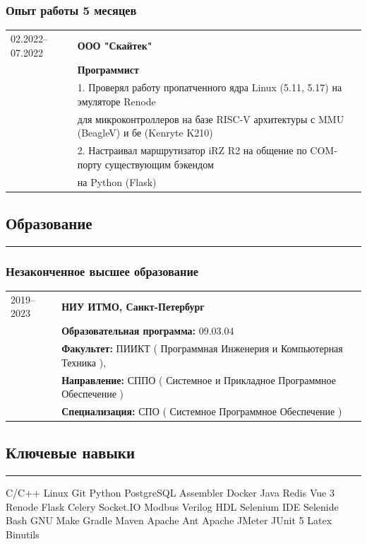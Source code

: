\documentclass[10pt, final, twoside]{article}
\newcommand{\skill}[1]{\colorbox{darkgray4}{\textcolor{darkgray2}{#1}}}
\begin{document}
  \subsubsection*{Опыт работы 5 месяцев}
  \begin{table}[H]
    \begin{tabular}{ll}
      02.2022--07.2022 & \textbf{ООО "Скайтек"}\\
                       & \textbf{Программист}\\
                       & 1. Проверял работу пропатченного ядра Linux (5.11, 5.17) на эмуляторе   Renode\\
                       & для микроконтроллеров на базе RISC-V архитектуры с MMU (BeagleV) и бе   (Kenryte K210)\\
                       & 2. Настраивал маршрутизатор iRZ R2 на общение по COM-порту    существующим бэкендом\\
                       & на Python (Flask)
    \end{tabular}
  \end{table}
  

  \subsection*{\textcolor{darkgray2}{Образование}}
  \vspace*{-5.5mm}
  \par\noindent\rule{\textwidth}{0.1pt}
  \subsubsection*{Незаконченное высшее образование}
  \begin{table}[H]
    \begin{tabular}{ll}
      2019--2023 & \textbf{НИУ ИТМО, Санкт-Петербург}\\
                 & \textbf{Образовательная программа:} 09.03.04\\
                 & \textbf{Факультет:} ПИИКТ ( Программная Инженерия и Компьютерная Техника ),\\
                 & \textbf{Направление:} СППО ( Системное и Прикладное Программное Обеспечение )\\
                 & \textbf{Специализация:} СПО ( Системное Программное Обеспечение )
    \end{tabular}
  \end{table}

  \subsection*{\textcolor{darkgray2}{Ключевые навыки}}
  \vspace*{-5.5mm}
  \par\noindent\rule{\textwidth}{0.1pt}
    \skill{C/C++} \skill{Linux} \skill{Git} \skill{Python} \skill{PostgreSQL} \skill{Assembler} \skill{Docker} \skill{Java} \skill{Redis} \skill{Vue 3} \skill{Renode} \skill{Flask} \skill{Celery} \skill{Socket.IO} \skill{Modbus} \skill{Verilog HDL} \skill{Selenium IDE} \skill{Selenide} \skill{Bash} \skill{GNU Make} \skill{Gradle} \skill{Maven} \skill{Apache Ant} \skill{Apache JMeter} \skill{JUnit 5} \skill{Latex} \skill{Binutils}
    
\end{document}

